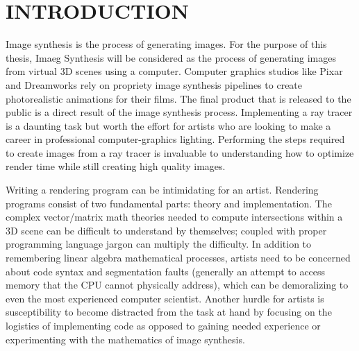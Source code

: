 %
%
%



\pagestyle{plain} %
\setcounter{page}{1}


\chapter{\uppercase {Introduction}}
Image synthesis is the process of generating images.  For the purpose of this thesis, Imaeg Synthesis will be considered as the process of generating images from virtual 3D scenes using a computer.  Computer graphics studios like Pixar and Dreamworks rely on propriety image synthesis pipelines to create photorealistic animations for their films.  The final product that is released to the public is a direct result of the image synthesis process.  Implementing a ray tracer is a daunting task but worth the effort for artists who are looking to make a career in professional computer-graphics lighting.  Performing the steps required to create images from a ray tracer is invaluable to understanding how to optimize render time while still creating high quality images.

Writing a rendering program can be intimidating for an artist. Rendering programs consist of two fundamental parts: theory and implementation.  The complex vector/matrix math theories needed to compute intersections within a 3D scene can be difficult to understand by themselves; coupled with proper programming language jargon can multiply the difficulty.  In addition to remembering linear algebra mathematical processes, artists need to be concerned about code syntax and segmentation faults (generally an attempt to access memory that the CPU cannot physically address), which can be demoralizing to even the most experienced computer scientist.  Another hurdle for artists is susceptibility to become distracted from the task at hand by focusing on the logistics of implementing code as opposed to gaining needed experience or experimenting with the mathematics of image synthesis.

